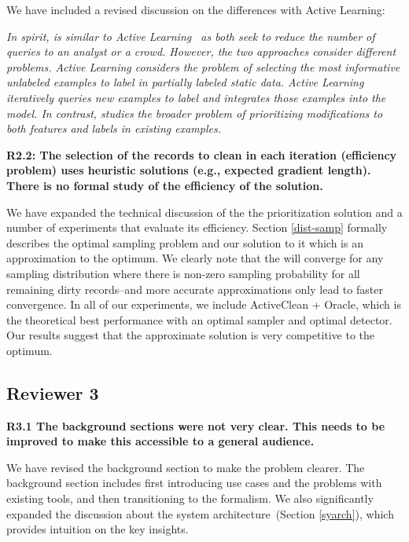\noindent  We have included a revised discussion on the differences with Active Learning:

\emph{In spirit, \sys is similar to Active Learning~\cite{DBLP:journals/pvldb/YakoutENOI11,gokhale2014corleone} as both seek to reduce the number of queries to an analyst or a crowd.
However, the two approaches consider different problems.
Active Learning considers the problem of selecting the most informative unlabeled examples to label in partially labeled static data.
Active Learning iteratively queries new examples to label and integrates those examples into the model.
In contrast, \sys studies the broader problem of prioritizing modifications to both features and labels in existing examples.}

\vspace{0.5em}

\noindent\textbf{R2.2: The selection of the records to clean in each iteration (efficiency problem) uses heuristic solutions (e.g., expected gradient length). There is no formal study of the efficiency of the solution.}

\noindent  We have expanded the technical discussion of the the prioritization solution and a number of experiments that evaluate its efficiency. Section \ref{dist-samp} formally describes the optimal sampling problem and our solution to it which is an approximation to the optimum. We clearly note that the \sys will converge for any sampling distribution where there is non-zero sampling probability for all remaining dirty records--and more accurate approximations only lead to faster convergence. In all of our experiments, we include ActiveClean + Oracle, which is the theoretical best performance with an optimal sampler and optimal detector.
Our results suggest that the approximate solution is very competitive to the optimum. 

 \subsection*{Reviewer 3}

\noindent\textbf{R3.1 The background sections were not very clear. This needs to be improved
to make this accessible to a general audience.}

\noindent  We have revised the background section to make the problem clearer. The background section includes first introducing use cases and the problems with existing tools, and then transitioning to the formalism. We also significantly expanded the discussion about the system architecture~(Section \ref{syarch}), which provides intuition on the key insights.

